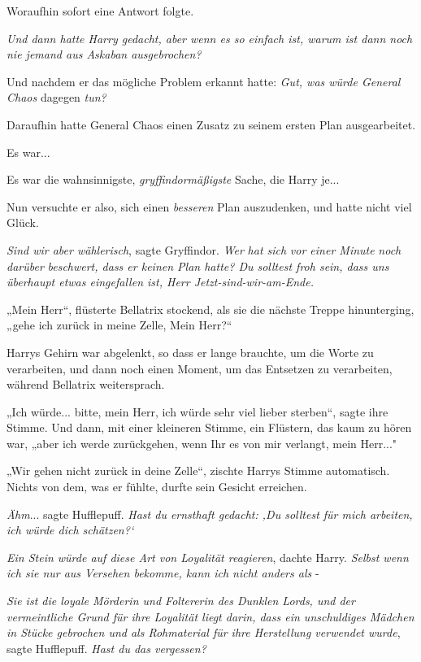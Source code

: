 {Woraufhin sofort eine Antwort folgte.

\emph{Und dann hatte Harry gedacht, \emph{aber wenn es} so \emph{einfach ist, warum ist} \emph{dann} \emph{noch nie jemand aus Askaban ausgebrochen?}}

Und nachdem er das mögliche Problem erkannt hatte: \emph{Gut, was würde General Chaos} dagegen \emph{tun?}

Daraufhin hatte General Chaos einen Zusatz zu seinem ersten Plan ausgearbeitet.

Es war...

Es war die wahnsinnigste, \emph{gryffindormäßigste} Sache, die Harry je...

Nun versuchte er also, sich einen \emph{besseren} Plan auszudenken, und hatte nicht viel Glück.

\emph{Sind wir aber wählerisch}, sagte Gryffindor. \emph{Wer} \emph{hat sich} \emph{vor einer Minute} \emph{noch} \emph{darüber} \emph{beschwert, dass er keinen Plan hatte? Du solltest froh sein, dass uns überhaupt etwas eingefallen ist, Herr Jetzt-sind-wir-am-Ende.}

„Mein Herr“, flüsterte Bellatrix stockend, als sie die nächste Treppe hinunterging, „gehe ich zurück in meine Zelle, Mein Herr?“

Harrys Gehirn war abgelenkt, so dass er lange brauchte, um die Worte zu verarbeiten, und dann noch einen Moment, um das Entsetzen zu verarbeiten, während Bellatrix weitersprach.

„Ich würde... bitte, mein Herr, ich würde sehr viel lieber sterben“, sagte ihre Stimme. Und dann, mit einer kleineren Stimme, ein Flüstern, das kaum zu hören war, „aber ich werde zurückgehen, wenn Ihr es von mir verlangt, mein Herr..."

„Wir gehen nicht zurück in deine Zelle“, zischte Harrys Stimme automatisch. Nichts von dem, was er fühlte, durfte sein Gesicht erreichen.

\emph{Ähm}... sagte Hufflepuff. \emph{Hast du ernsthaft gedacht: ‚Du solltest für mich arbeiten, ich würde dich schätzen?`}

\emph{Ein Stein würde auf diese Art von Loyalität reagieren}, dachte Harry. \emph{Selbst wenn ich sie nur aus Versehen bekomme, kann ich nicht anders als} -

\emph{Sie ist die loyale Mörderin und Foltererin des Dunklen Lords, und der vermeintliche Grund für ihre Loyalität liegt darin, dass ein unschuldiges Mädchen in Stücke gebrochen und als Rohmaterial für ihre Herstellung verwendet wurde}, sagte Hufflepuff. \emph{Hast du das vergessen?}

}
